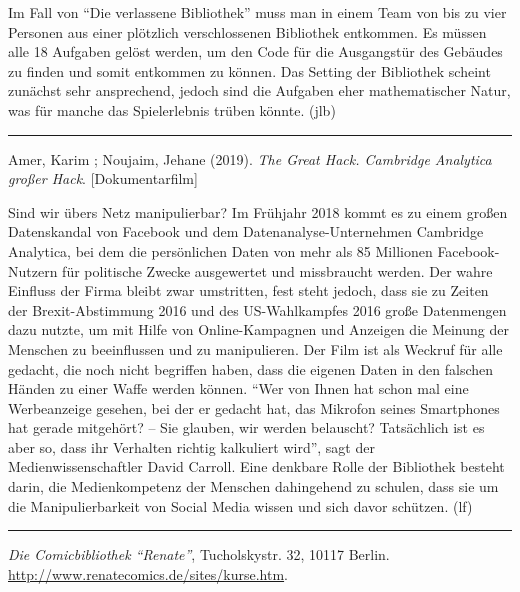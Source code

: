 \documentclass[a4paper,
fontsize=11pt,
oneside,
numbers=noperiodatend,
parskip=half-,
bibliography=totoc,
final
]{scrartcl}
\begin{document}
Im Fall von \enquote{Die verlassene Bibliothek} muss man in einem Team
von bis zu vier Personen aus einer plötzlich verschlossenen Bibliothek
entkommen. Es müssen alle 18 Aufgaben gelöst werden, um den Code für die
Ausgangstür des Gebäudes zu finden und somit entkommen zu können. Das
Setting der Bibliothek scheint zunächst sehr ansprechend, jedoch sind
die Aufgaben eher mathematischer Natur, was für manche das Spielerlebnis
trüben könnte. (jlb)

\begin{center}\rule{0.5\linewidth}{0.5pt}\end{center}

Amer, Karim ; Noujaim, Jehane (2019). \emph{The Great Hack. Cambridge
Analytica großer Hack}. {[}Dokumentarfilm{]}

Sind wir übers Netz manipulierbar? Im Frühjahr 2018 kommt es zu einem
großen Datenskandal von Facebook und dem Datenanalyse-Unternehmen
Cambridge Analytica, bei dem die persönlichen Daten von mehr als 85
Millionen Facebook-Nutzern für politische Zwecke ausgewertet und
missbraucht werden. Der wahre Einfluss der Firma bleibt zwar umstritten,
fest steht jedoch, dass sie zu Zeiten der Brexit-Abstimmung 2016 und des
US-Wahlkampfes 2016 große Datenmengen dazu nutzte, um mit Hilfe von
Online-Kampagnen und Anzeigen die Meinung der Menschen zu beeinflussen
und zu manipulieren. Der Film ist als Weckruf für alle gedacht, die noch
nicht begriffen haben, dass die eigenen Daten in den falschen Händen zu
einer Waffe werden können. \enquote{Wer von Ihnen hat schon mal eine
Werbeanzeige gesehen, bei der er gedacht hat, das Mikrofon seines
Smartphones hat gerade mitgehört? -- Sie glauben, wir werden belauscht?
Tatsächlich ist es aber so, dass ihr Verhalten richtig kalkuliert wird},
sagt der Medienwissenschaftler David Carroll. Eine denkbare Rolle der
Bibliothek besteht darin, die Medienkompetenz der Menschen dahingehend
zu schulen, dass sie um die Manipulierbarkeit von Social Media wissen
und sich davor schützen. (lf)

\begin{center}\rule{0.5\linewidth}{0.5pt}\end{center}

\emph{Die Comicbibliothek \enquote{Renate}}, Tucholskystr. 32, 10117
Berlin. \url{http://www.renatecomics.de/sites/kurse.htm}.
\end{document}
